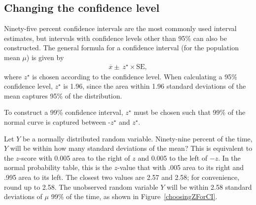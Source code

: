 \begin{spacing}{1.5}

\subsection{Changing the confidence level}
\label{changingTheConfidenceLevelSection}


Ninety-five percent confidence intervals are the most commonly used interval estimates, but intervals with confidence levels other than 95\% can also be constructed. The general formula for a confidence interval (for the population mean $\mu$) is given by 
\begin{align}
	\overline{x} \pm \ z^{\star} \times \text{SE},
\end{align}
where $z^{\star}$ is chosen according to the confidence level. When calculating a 95\% confidence level, $z^{\star}$ is 1.96, since the area within 1.96 standard deviations of the mean captures 95\% of the distribution.

To construct a 99\% confidence interval, $z^{\star}$ must be chosen such that 99\% of the normal curve is captured between -$z^{\star}$ and $z^{\star}$.

\begin{example}{Let $Y$ be a normally distributed random variable. Ninety-nine percent of the time, $Y$ will be within how many standard deviations of the mean?}
	This is equivalent to the $z$-score with 0.005 area to the right of $z$ and 0.005 to the left of $-z$. In the normal probability table, this is the $z$-value that with .005 area to its right and .995 area to its left. The closest two values are 2.57 and 2.58; for convenience, round up to 2.58. The unobserved random variable $Y$ will be within 2.58 standard deviations of $\mu$ 99\% of the time, as shown in Figure~\ref{choosingZForCI}.
\end{example}


\end{spacing}
